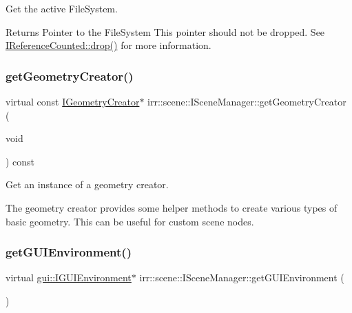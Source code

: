 Get the active File\+System. 

\begin{DoxyReturn}{Returns}
Pointer to the File\+System This pointer should not be dropped. See \hyperlink{classirr_1_1IReferenceCounted_a03856a09355b89d178090c4a5f738543}{I\+Reference\+Counted\+::drop()} for more information. 
\end{DoxyReturn}
\mbox{\label{classirr_1_1scene_1_1ISceneManager_a9840cfd39b44f238d06b7bc51e6ba1f6}} 
\subsubsection{\texorpdfstring{get\+Geometry\+Creator()}{getGeometryCreator()}}
{\footnotesize\ttfamily virtual const \hyperlink{classirr_1_1scene_1_1IGeometryCreator}{I\+Geometry\+Creator}$\ast$ irr\+::scene\+::\+I\+Scene\+Manager\+::get\+Geometry\+Creator (\begin{DoxyParamCaption}\item[{void}]{ }\end{DoxyParamCaption}) const\hspace{0.3cm}{\ttfamily [pure virtual]}}



Get an instance of a geometry creator. 

The geometry creator provides some helper methods to create various types of basic geometry. This can be useful for custom scene nodes. \mbox{\label{classirr_1_1scene_1_1ISceneManager_ad887536e9cc41d0670364f9f0a0f4510}} 
\subsubsection{\texorpdfstring{get\+G\+U\+I\+Environment()}{getGUIEnvironment()}}
{\footnotesize\ttfamily virtual \hyperlink{classirr_1_1gui_1_1IGUIEnvironment}{gui\+::\+I\+G\+U\+I\+Environment}$\ast$ irr\+::scene\+::\+I\+Scene\+Manager\+::get\+G\+U\+I\+Environment (\begin{DoxyParamCaption}{ }\end{DoxyParamCaption})\hspace{0.3cm}{\ttfamily [pure virtual]}}



